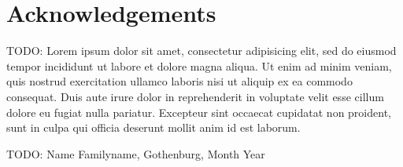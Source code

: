 \thispagestyle{plain}			%
\section*{Acknowledgements}
TODO: Lorem ipsum dolor sit amet, consectetur adipisicing elit, sed do eiusmod tempor incididunt ut labore et dolore magna aliqua. Ut enim ad minim veniam, quis nostrud exercitation ullamco laboris nisi ut aliquip ex ea commodo consequat. Duis aute irure dolor in reprehenderit in voluptate velit esse cillum dolore eu fugiat nulla pariatur. Excepteur sint occaecat cupidatat non proident, sunt in culpa qui officia deserunt mollit anim id est laborum.

\vspace{1.5cm}
\hfill
TODO: Name Familyname, Gothenburg, Month Year

\newpage				%
\thispagestyle{empty}
\mbox{}